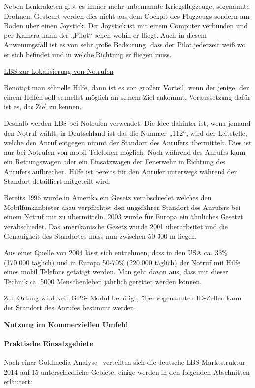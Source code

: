 Neben Lenkraketen gibt es immer mehr unbemannte Kriegsflugzeuge, sogenannte Drohnen. Gesteurt werden dies nicht aus dem Cockpit des Flugzeugs sondern am Boden über einen Joystick. Der Joystick ist mit einem Computer verbunden und per Kamera kann der „Pilot“ sehen wohin er fliegt. Auch in diesem Anwenungsfall ist es von sehr große Bedeutung, dass der Pilot jederzeit weiß wo er sich befindet und in welche Richtung er fliegen muss. 

\underline{LBS zur Lokalisierung von Notrufen}

Benötigt man schnelle Hilfe, dann ist es von großem Vorteil, wenn der jenige, der einem Helfen soll schnellst möglich an seinem Ziel ankommt. Voraussetzung dafür ist es, das Ziel zu kennen.

Deshalb werden LBS bei Notrufen verwendet. Die Idee dahinter ist, wenn jemand den Notruf wählt, in Deutschland ist das die Nummer „112“, wird der Leitstelle, welche den Anruf entgegen nimmt der Standort des Anrufers übermittelt. Dies ist nur bei Notrufen von mobil Telefonen möglich. Noch während des Anrufes kann ein Rettungswagen oder ein Einsatzwagen der Feuerwehr in Richtung des Anrufers aufbrechen. Hilfe ist bereits für den Anrufer unterwegs während der Standort detailliert mitgeteilt wird.

Bereits 1996 wurde in Amerika ein Gesetz verabschiedet welches den Mobilfunkanbieter dazu verpflichtet den ungefähren Standort des Anrufers bei einem Notruf mit zu übermitteln.  2003 wurde für Europa ein ähnliches Gesetzt verabschiedet. Das amerikanische Gesetz wurde 2001 überarbeitet und die Genauigkeit des Standortes muss nun zwischen 50-300 m liegen.  

Aus einer Quelle von 2004 lässt sich entnehmen, dass in den USA ca. 33\% (170.000 täglich) und in Europa 50-70\% (220.000 täglich) der Notruf mit Hilfe eines mobil Telefons getätigt werden. Man geht davon aus, dass mit dieser Technik ca. 5000 Menschenleben jährlich gerettet werden können.

Zur Ortung wird kein GPS- Modul benötigt, über sogenannten ID-Zellen kann der Standort des Anrufes bestimmt werden.\cite{Schiller2004}




\textbf{ \underline{Nutzung im Kommerziellen Umfeld } }

\paragraph{Praktische Einsatzgebiete}
Nach einer Goldmedia-Analyse~\cite[S.9]{goldmedia:lbs} verteilten sich die deutsche LBS-Marktstruktur 2014 auf 15 unterschiedliche Gebiete, einige werden in den folgenden Abschnitten erläutert:\\

